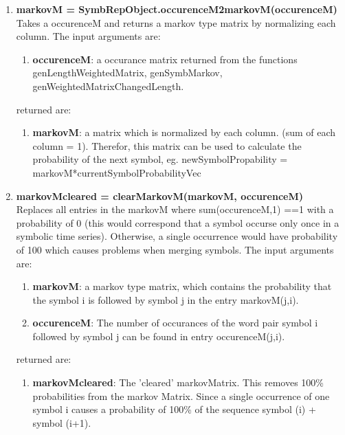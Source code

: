 \documentclass[a4]{scrreprt}
\begin{document}
	\begin{enumerate}
		\item \textbf{markovM = SymbRepObject.occurenceM2markovM(occurenceM)}\\
			Takes a occurenceM and returns a markov type matrix by normalizing each column.
			The input arguments are:
			\begin{enumerate}
				\item \textbf{occurenceM}: a occurance matrix returned from the functions genLengthWeightedMatrix, genSymbMarkov, genWeightedMatrixChangedLength.
			\end{enumerate}
			returned are:
			\begin{enumerate}
				\item \textbf{markovM}:  a matrix which is normalized by each column. (sum of each column = 1). Therefor, this matrix can be used to  calculate the probability of the next symbol, eg.  newSymbolPropability = markovM*currentSymbolProbabilityVec
			\end{enumerate}
		
		\item \textbf{markovMcleared = clearMarkovM(markovM, occurenceM)}\\
			Replaces all entries in the markovM where sum(occurenceM,1) ==1 with a probability of 0 (this would correspond that a symbol occurse only once in a symbolic time series). Otherwise, a single occurrence would have probability of 100  which causes problems when merging symbols.
			The input arguments are:
			\begin{enumerate}
				\item \textbf{markovM}: a markov type matrix, which contains the probability that the symbol i is followed by symbol j in the entry markovM(j,i).
				\item \textbf{occurenceM}: The number of occurances of the word pair symbol i followed by symbol j can be found in entry occurenceM(j,i).
			\end{enumerate}
			returned are:
			\begin{enumerate}
				\item \textbf{markovMcleared}: The 'cleared' markovMatrix. This removes 100\% probabilities from the markov Matrix. Since a single occurrence of one symbol i causes a probability of 	100\% of the sequence symbol (i) + symbol (i+1).  
			\end{enumerate}
		
	\end{enumerate}
\end{document}

